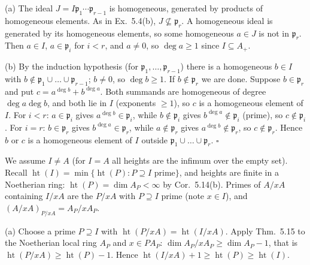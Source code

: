 \documentclass[11pt]{article}
\begin{document}
(a) The ideal $J=I\mathfrak p_1\cdots\mathfrak p_{r-1}$ is homogeneous, generated by products of homogeneous elements. As in Ex.~5.4(b), $J\not\subseteq\mathfrak p_r$. A homogeneous ideal is generated by its homogeneous elements, so some homogeneous $a\in J$ is not in $\mathfrak p_r$. Then $a\in I$, $a\in\mathfrak p_i$ for $i<r$, and $a\neq0$, so $\deg a\ge1$ since $I\subseteq A_+$.

(b) By the induction hypothesis (for $\mathfrak p_1,\dots,\mathfrak p_{r-1}$) there is a homogeneous $b\in I$ with $b\notin\mathfrak p_1\cup\dots\cup\mathfrak p_{r-1}$; $b\ne0$, so $\deg b\ge1$. If $b\notin\mathfrak p_r$ we are done. Suppose $b\in\mathfrak p_r$ and put $c=a^{\deg b}+b^{\deg a}$. Both summands are homogeneous of degree $\deg a\deg b$, and both lie in $I$ (exponents $\ge1$), so $c$ is a homogeneous element of $I$. For $i<r$: $a\in\mathfrak p_i$ gives $a^{\deg b}\in\mathfrak p_i$, while $b\notin\mathfrak p_i$ gives $b^{\deg a}\notin\mathfrak p_i$ (prime), so $c\notin\mathfrak p_i$. For $i=r$: $b\in\mathfrak p_r$ gives $b^{\deg a}\in\mathfrak p_r$, while $a\notin\mathfrak p_r$ gives $a^{\deg b}\notin\mathfrak p_r$, so $c\notin\mathfrak p_r$. Hence $b$ or $c$ is a homogeneous element of $I$ outside $\mathfrak p_1\cup\dots\cup\mathfrak p_r$. \hfill$\square$

\pf
We assume $I\ne A$ (for $I=A$ all heights are the infimum over the empty set). Recall $\operatorname{ht}(I)=\min\{\operatorname{ht}(P):P\supseteq I\text{ prime}\}$, and heights are finite in a Noetherian ring: $\operatorname{ht}(P)=\dim A_P<\infty$ by Cor.~5.14(b). Primes of $A/xA$ containing $I/xA$ are the $P/xA$ with $P\supseteq I$ prime (note $x\in I$), and $(A/xA)_{P/xA}=A_P/xA_P$.

(a) Choose a prime $P\supseteq I$ with $\operatorname{ht}(P/xA)=\operatorname{ht}(I/xA)$. Apply Thm.~5.15 to the Noetherian local ring $A_P$ and $x\in PA_P$: $\dim A_P/xA_P\ge\dim A_P-1$, that is $\operatorname{ht}(P/xA)\ge\operatorname{ht}(P)-1$. Hence $\operatorname{ht}(I/xA)+1\ge\operatorname{ht}(P)\ge\operatorname{ht}(I)$.
\end{document}

